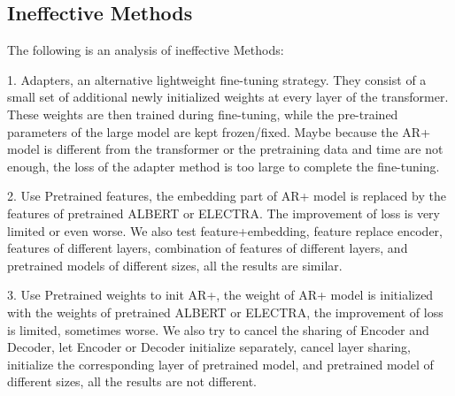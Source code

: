 \documentclass[letterpaper]{article} %
\DeclareRobustCommand{\citeext}[1]{\cite[#1]{#1}}
\begin{document}
\begin{table*} [b]
\centering
\caption{Experimental results, bold data is improved metric}
\label{tab:result-comparisons}
\end{table*}


\subsection[Ineffective Methods]{Ineffective Methods} 
The following is an analysis of ineffective Methods: 

1. Adapters\citeext{Houlsby2019}, an alternative lightweight fine-tuning strategy. They consist of a small set of additional newly initialized weights at every layer of the transformer. These weights are then trained during fine-tuning, while the pre-trained parameters of the large model are kept frozen/fixed. Maybe because the AR+ model is different from the transformer or the pretraining data and time are not enough, the loss of the adapter method is too large to complete the fine-tuning. 

2. Use Pretrained features\citeext{Devlin2019}, the embedding part of AR+ model is replaced by the features of pretrained ALBERT\citeext{Lan2019} or ELECTRA\citeext{Clark2020}. The improvement of loss is very limited or even worse. We also test feature+embedding, feature replace encoder, features of different layers, combination of features of different layers, and pretrained models of different sizes, all the results are similar. 

3. Use Pretrained weights to init AR+\citeext{Ziegler2019}, the weight of AR+ model is initialized with the weights of pretrained ALBERT or ELECTRA, the improvement of loss is limited, sometimes worse. We also try to cancel the sharing of Encoder and Decoder, let Encoder or Decoder initialize separately, cancel layer sharing, initialize the corresponding layer of pretrained model, and pretrained model of different sizes, all the results are not different. 
\end{document}
